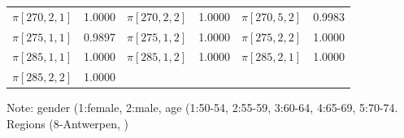 \documentclass[12pt]{article}
\begin{document}
\begin{table}[h!]
\begin{threeparttable}
\begin{tabular}{cc|cc|cc}
        $\pi[270,2,1]$ & 1.0000 & $\pi[270,2,2]$ & 1.0000 & $\pi[270,5,2]$ & 0.9983 \\ 
        $\pi[275,1,1]$ & 0.9897 & $\pi[275,1,2]$ & 1.0000 & $\pi[275,2,2]$ & 1.0000 \\ 
        $\pi[285,1,1]$ & 1.0000 & $\pi[285,1,2]$ & 1.0000 & $\pi[285,2,1]$ & 1.0000 \\ 
        $\pi[285,2,2]$ & 1.0000 & & & & \\ \hline
        \end{tabular}
        \begin{tablenotes}
          \centering
          \tiny
          \item Note: gender (1:female, 2:male, age (1:50-54, 2:55-59, 3:60-64, 4:65-69, 5:70-74. Regions (8-Antwerpen, )
        \end{tablenotes}
    \end{threeparttable}
\end{table}
\FloatBarrier


    





\end{document}

